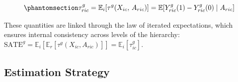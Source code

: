 \documentclass[
  10pt,
  a4paper,
  DIV=11,
  numbers=noendperiod]{scrartcl}
\begin{document}
\begin{equation}\protect\phantomsection\label{eq-cate-profile}{
    \tau_{ric}^{g}
        = \mathbb{E}_{i}\!\left[\tau^{g}(X_{ic},\, A_{ric})\right]
        = \mathbb{E}\!\left[
            Y_{ric}^{g}(1) - Y_{ric}^{g}(0)
            \;\middle|\;
            A_{ric}
          \right]
}\end{equation}

These quantities are linked through the law of iterated expectations,
which ensures internal consistency across levels of the hierarchy:
\(\text{SATE}^{g} = \mathbb{E}_{i}\!\left[\mathbb{E}_{r}[\tau^{g}(X_{ic}, A_{ric})]\right] = \mathbb{E}_{i}[\tau_{ic}^{g}]\).

\subsection{Estimation Strategy}\label{estimation-strategy}
\end{document}
